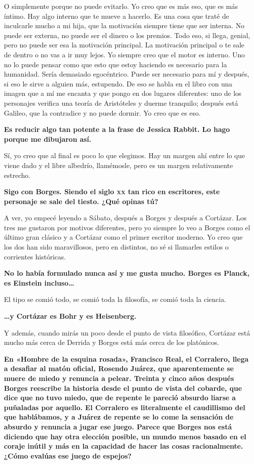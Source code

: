 \documentclass[11pt,a4paper]{article}
\newcommand{\preg}[1]{\textbf{#1}}
\begin{document}
O simplemente porque no puede evitarlo. Yo creo que es más eso, que es más íntimo. Hay algo interno que te mueve a hacerlo. Es una cosa que traté de inculcarle mucho a mi hija, que la motivación siempre tiene que ser interna. No puede ser externa, no puede ser el dinero o los premios. Todo eso, si llega, genial, pero no puede ser esa la motivación principal. La motivación principal o te sale de dentro o no vas a ir muy lejos. Yo siempre creo que el motor es interno. Uno no lo puede pensar como que esto que estoy haciendo es necesario para la humanidad. Sería demasiado egocéntrico. Puede ser necesario para mí y después, si eso le sirve a alguien más, estupendo. De eso se habla en el libro con una imagen que a mí me encanta y que pongo en dos lugares diferentes: uno de los personajes verifica una teoría de Aristóteles y duerme tranquilo; después está Galileo, que la contradice y no puede dormir. Yo creo que es eso.

\preg{Es reducir algo tan potente a la frase de Jessica Rabbit. Lo hago porque me dibujaron así.}

Sí, yo creo que al final es poco lo que elegimos. Hay un margen ahí entre lo que viene dado y el libre albedrío, llamémosle, pero es un margen relativamente estrecho.

\preg{Sigo con Borges. Siendo el siglo \textsc{xx} tan rico en escritores, este personaje se sale del tiesto. ¿Qué opinas tú?}

A ver, yo empecé leyendo a Sábato, después a Borges y después a Cortázar. Los tres me gustaron por motivos diferentes, pero yo siempre lo veo a Borges como el último gran clásico y a Cortázar como el primer escritor moderno. Yo creo que los dos han sido maravillosos, pero en distintos, no sé si llamarles estilos o corrientes históricas.

\preg{No lo había formulado nunca así y me gusta mucho. Borges es Planck, es Einstein incluso…}

El tipo se comió todo, se comió toda la filosofía, se comió toda la ciencia.

\preg{…y Cortázar es Bohr y es Heisenberg.}

Y además, cuando mirás un poco desde el punto de vista filosófico, Cortázar está mucho más cerca de Derrida y Borges está más cerca de los platónicos.

\preg{En «Hombre de la esquina rosada», Francisco Real, el Corralero, llega a desafiar al matón oficial, Rosendo Juárez, que aparentemente se muere de miedo y renuncia a pelear. Treinta y cinco años después Borges reescribe la historia desde el punto de vista del cobarde, que dice que no tuvo miedo, que de repente le pareció absurdo liarse a puñaladas por aquello. El Corralero es literalmente el caudillismo del que hablábamos, y a Juárez de repente se lo come la sensación de absurdo y renuncia a jugar ese juego. Parece que Borges nos está diciendo que hay otra elección posible, un mundo menos basado en el coraje inútil y más en la capacidad de hacer las cosas racionalmente. ¿Cómo evalúas ese juego de espejos?}
\end{document}
